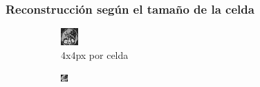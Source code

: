 \documentclass[11pt]{beamer}
\begin{document}
\begin{frame}
    \frametitle{Reconstrucción según el tamaño de la celda}
    \begin{figure}[H]
    \centering
    \begin{subfigure}[h]{0.30\textwidth}
        \includegraphics[width=\textwidth]{img/tomo_granu_4.png}
        \caption{4x4px por celda}
        \label{fig:reconstruccion 4 px}
    \end{subfigure}%
    \hfill
    \begin{subfigure}[h]{0.30\textwidth}
            \includegraphics[width=\textwidth]{img/tomo_granu_10.png}

\end{subfigure}
\end{figure}
\end{frame}
\end{document}
